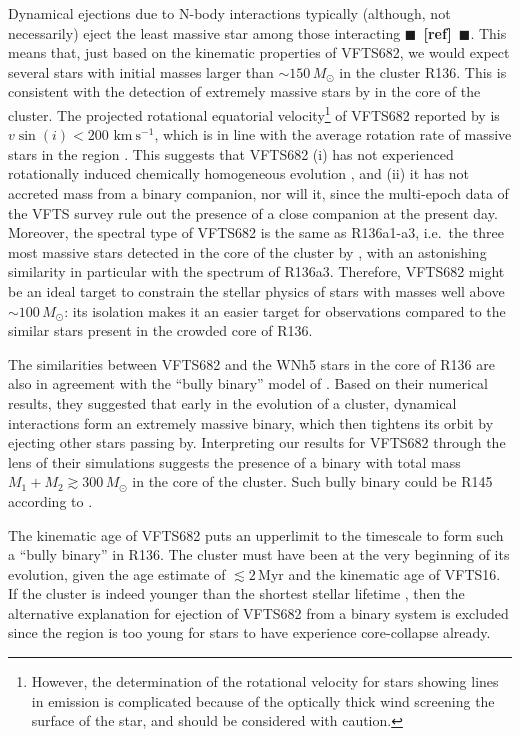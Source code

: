 \documentclass[apjl,twocolumn]{emulateapj}
\newcommand{\todo}[1]{{\large $\blacksquare$~\textbf{\color{red}[#1]}}~$\blacksquare$}
\newcommand{\kms}{{\,\mathrm{km\ s^{-1}}}}
\begin{document}
Dynamical ejections due to N-body interactions typically (although, not necessarily) eject the least
massive star among those interacting \todo{ref}. This means that, just
based on the kinematic properties of VFTS682, we would expect several
stars with initial masses larger than $\sim$$150\,M_\odot$ in the
cluster R136.
This is consistent with the detection
of extremely massive stars by \cite{crowther:10} in the core of the
cluster. The projected rotational equatorial
velocity\footnote{However, the determination of the rotational
  velocity for stars showing lines in emission is complicated because
  of the optically thick wind screening the surface of the star, and should be
  considered with caution.} of VFTS682
reported by \cite{schneider:18} is $v\sin(i)<200\,\kms$, which is in
line with the average rotation rate of massive stars in the region
\citep[][]{ramirez-agudelo:15}. This suggests that VFTS682 (i) has not
experienced rotationally induced chemically homogeneous evolution
\citep[][]{maeder:00,demink:09,marchant:16}, and (ii) it has not
accreted mass from a binary companion, nor will it, since the multi-epoch
data of the VFTS survey rule out the presence of a close companion at the
present day. Moreover, the spectral type of VFTS682
\citep[WNh5,][]{bestenlehner:11} is the same as R136a1-a3, i.e.~the
three most massive stars detected in the core of the cluster by
\cite{crowther:10}, with an astonishing similarity in particular with
the spectrum of R136a3. Therefore,
VFTS682 might be an ideal target to constrain the stellar physics of
stars with masses well above $\sim$$100\,M_\odot$: its isolation makes
it an easier target for observations compared to the similar stars
present in the crowded core of R136.

The similarities between VFTS682 and the WNh5 stars in the core of
R136 are also in agreement with the ``bully binary'' model of
\cite{fujii:11}. Based on their numerical results, they suggested that
early in the evolution of a cluster, dynamical interactions form an extremely
massive binary, which then tightens its orbit by ejecting other stars passing
by. Interpreting our results for VFTS682 through the lens of their simulations
suggests the presence of a binary with total mass
$M_1+M_2\gtrsim 300\,M_\odot$ in the core of the cluster. Such bully
binary could be R145 according to \cite{fujii:11}.

The kinematic age of VFTS682 puts an
upperlimit to the timescale to form such a ``bully binary'' in
R136. The cluster must have been at the very beginning of its
evolution, given the age estimate of $\lesssim 2$\,Myr
\citep[][]{crowther:10,sabbi:12} and the kinematic age of VFTS16. If the
cluster is indeed younger than the shortest stellar lifetime
\citep[$\sim$3\,Myr, e.g.,][]{zapartas:17}, then the alternative
explanation for ejection of VFTS682 from a binary
system is excluded since the region is too young for stars
to have experience core-collapse already.
\end{document}
